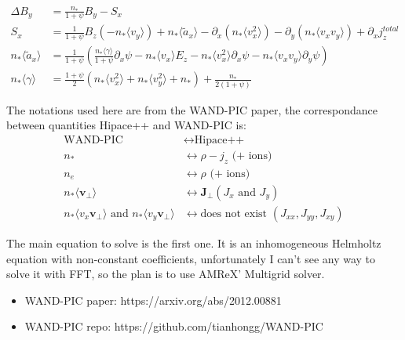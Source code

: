 \documentclass{article}
\begin{document}
\begin{subequations}
	\begin{align}
	\Delta B_y &= \frac{n_*}{1+\psi} B_y - S_x \\
	S_x &= \frac{1}{1+\psi} B_z \left(-n_* \langle v_y\rangle \right) + n_* \langle \tilde{a}_x \rangle - \partial_x\left( n_*\langle v_x^2 \rangle \right) - \partial_y\left( n_*\langle v_x v_y \rangle \right) + \partial_x j_z^{total} \\
	n_* \langle \tilde{a}_x \rangle &= \frac{1}{1+\psi} \left(  \frac{n_*\langle\gamma\rangle}{1+\psi}\partial_x\psi - n_* \langle v_x \rangle E_z - n_* \langle v_x^2\rangle \partial_x\psi - n_* \langle v_x v_y \rangle \partial_y\psi \right) \\
	n_*\langle \gamma\rangle &= \frac{1+\psi}{2}\left(n_*\langle v_x^2\rangle + n_*\langle v_y^2\rangle + n_*\right) + \frac{n_*}{2(1+\psi)}
	\end{align}
\end{subequations}

The notations used here are from the WAND-PIC paper, the correspondance between quantities Hipace++ and WAND-PIC is:
\begin{subequations}
\begin{align}
\text{WAND-PIC} &\leftrightarrow \text{Hipace++} \\
n_* &\leftrightarrow \rho - j_z \text{ (+ ions)} \\
n_e &\leftrightarrow \rho \text{ (+ ions)}  \\
n_*\langle \bm{v_\perp}\rangle &\leftrightarrow \bm{J_\perp} (J_x \text{ and } J_y) \\
n_*\langle v_x \bm{v_\perp}\rangle \text{ and } n_*\langle v_y \bm{v_\perp}\rangle &\leftrightarrow \text{does not exist } (J_{xx}, J_{yy}, J_{xy})
\end{align}
\end{subequations}

The main equation to solve is the first one. It is an inhomogeneous Helmholtz equation with non-constant coefficients, unfortunately I can't see any way to solve it with FFT, so the plan is to use AMReX' Multigrid solver.

\begin{itemize}
\item WAND-PIC paper: https://arxiv.org/abs/2012.00881
\item WAND-PIC repo: https://github.com/tianhongg/WAND-PIC
\end{itemize}
\end{document}
